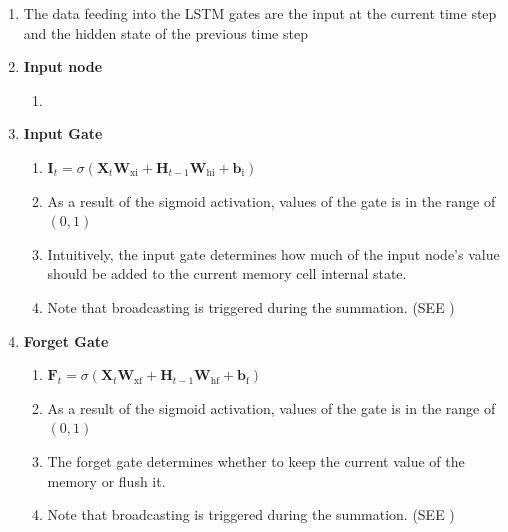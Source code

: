 \begin{enumerate}[itemsep=0.15cm]
    \item The data feeding into the LSTM gates are the input at the current time step and the hidden state of the previous time step

    \item \textbf{Input node}
    \begin{enumerate}
        \item 

    \end{enumerate}

    \item \textbf{Input Gate}
    \begin{enumerate}
        \item $\mathbf{I}_t = \sigma(\mathbf{X}_t \mathbf{W}_{\textrm{xi}} + \mathbf{H}_{t-1} \mathbf{W}_{\textrm{hi}} + \mathbf{b}_\textrm{i})$

        \item As a result of the sigmoid activation, values of the gate is in the range of $(0,1)$

        \item Intuitively, the input gate determines how much of the input node’s value should be added to the current memory cell internal state.

        \item Note that broadcasting is triggered during the summation. (SEE )
    \end{enumerate}

    \item \textbf{Forget Gate}
    \begin{enumerate}
        \item $\mathbf{F}_t = \sigma(\mathbf{X}_t \mathbf{W}_{\textrm{xf}} + \mathbf{H}_{t-1} \mathbf{W}_{\textrm{hf}} + \mathbf{b}_\textrm{f})$

        \item As a result of the sigmoid activation, values of the gate is in the range of $(0,1)$

        \item The forget gate determines whether to keep the current value of the memory or flush it.

        \item Note that broadcasting is triggered during the summation. (SEE )
    \end{enumerate}


\end{enumerate}
